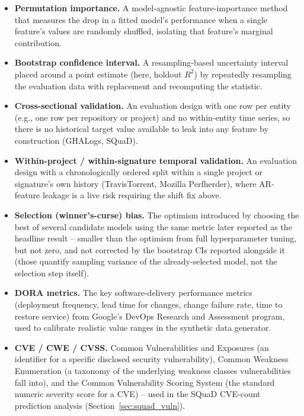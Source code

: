 \documentclass[technologies,article,submit,pdftex,moreauthors]{Definitions/mdpi}
\begin{document}
{\begin{itemize}
\item \textbf{Permutation importance.} A model-agnostic feature-importance method that measures the drop in a fitted model's performance when a single feature's values are randomly shuffled, isolating that feature's marginal contribution.
\item \textbf{Bootstrap confidence interval.} A resampling-based uncertainty interval placed around a point estimate (here, holdout \(R^2\)) by repeatedly resampling the evaluation data with replacement and recomputing the statistic.
\item \textbf{Cross-sectional validation.} An evaluation design with one row per entity (e.g., one row per repository or project) and no within-entity time series, so there is no historical target value available to leak into any feature by construction (GHALogs, SQuaD).
\item \textbf{Within-project / within-signature temporal validation.} An evaluation design with a chronologically ordered split within a single project or signature's own history (TravisTorrent, Mozilla Perfherder), where AR-feature leakage is a live risk requiring the shift fix above.
\item \textbf{Selection (winner's-curse) bias.} The optimism introduced by choosing the best of several candidate models using the same metric later reported as the headline result -- smaller than the optimism from full hyperparameter tuning, but not zero, and not corrected by the bootstrap CIs reported alongside it (those quantify sampling variance of the already-selected model, not the selection step itself).
\item \textbf{DORA metrics.} The key software-delivery performance metrics (deployment frequency, lead time for changes, change failure rate, time to restore service) from Google's DevOps Research and Assessment program, used to calibrate realistic value ranges in the synthetic data generator.
\item \textbf{CVE / CWE / CVSS.} Common Vulnerabilities and Exposures (an identifier for a specific disclosed security vulnerability), Common Weakness Enumeration (a taxonomy of the underlying weakness classes vulnerabilities fall into), and the Common Vulnerability Scoring System (the standard numeric severity score for a CVE) -- used in the SQuaD CVE-count prediction analysis (Section~\ref{sec:squad_vuln}).
\end{itemize}

}
\end{document}
